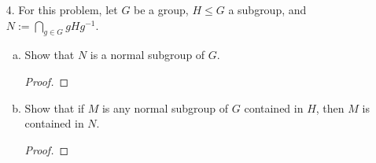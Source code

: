 \begin{itemize}
\begin{enumerate}[(a)]
\begin{proof}
    \end{proof}
    
    \item Suppose $g(x), h(x) \in \bbf[x]$ are such that $g(\phi)h(\phi) = 0$, the zero map on $V$, and $\text{gcd}(g(x), h(x)) = 1$. Show that $V$ is the direct sum of $V_g$ and $V_h$.
    \begin{proof}

    \end{proof}
    
    \item Suppose $\bbf = \bbc$, and $\phi$ has characteristic polynomial $f(x) = x^m (x^2+1)^t$ where $m + 2t = n$ and minimal polynomial $m(x) = x(x^2 + 1)$. Show that $\phi$ has $n$ independent eigenvectors in $V$, hence the matrix of $\phi$ under any basis of $V$ is diagonalizable.
    \begin{proof}

    \end{proof}
    
    \item Give an example of $V$ and $\phi$ so that $\phi$ has characteristic polynomial $f(x) = x^m (x^2+1)^t$ where $m+2t = n$ and minimal polynomial $m(x) = x^2(x^2+1)$, and show that the matrix of $\phi$ under any basis of $V$ is not diagonalizable. (Hint: Fix a basis of $V$, construct the matrix of $\phi$ under this basis, using Jordan normal form.)
    \begin{proof}

    \end{proof}
\end{enumerate}








\item[4.] For this problem, let $G$ be a group, $H \leq G$ a subgroup, and $N := \bigcap_{g \in G} gHg^{-1}$.

\begin{enumerate}[(a)]
    \item Show that $N$ is a normal subgroup of $G$. 
    \begin{proof}

    \end{proof}
    
    \item Show that if $M$ is any normal subgroup of $G$ contained in $H$, then $M$ is contained in $N$.
    \begin{proof}


\end{proof}
\end{enumerate}
\end{itemize}
